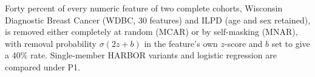 Forty percent of every numeric feature of two complete cohorts, Wisconsin Diagnostic Breast Cancer (WDBC, 30 features) \cite{uwdbc} and ILPD (age and sex retained), is removed either completely at random (MCAR) or by self-masking (MNAR), with removal probability $\sigma(2z+b)$ in the feature's own $z$-score and $b$ set to give a 40\% rate. Single-member HARBOR variants and logistic regression are compared under P1.
